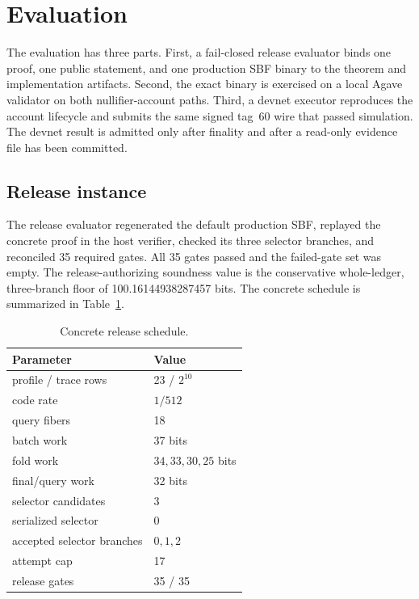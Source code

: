 \section{Evaluation}
\label{sec:evaluation}

The evaluation has three parts.  First, a fail-closed release evaluator binds
one proof, one public statement, and one production SBF binary to the theorem
and implementation artifacts.  Second, the exact binary is exercised on a
local Agave validator on both nullifier-account paths.  Third, a devnet
executor reproduces the account lifecycle and submits the same signed tag~60
wire that passed simulation.  The devnet result is admitted only after
finality and after a read-only evidence file has been committed.

\subsection{Release instance}
\label{sec:evaluation-release}

The release evaluator regenerated the default production SBF, replayed the
concrete proof in the host verifier, checked its three selector branches, and
reconciled 35 required gates.  All 35 gates passed and the failed-gate set was
empty.  The release-authorizing soundness value is the conservative
whole-ledger, three-branch floor of 100.16144938287457 bits.  The concrete
schedule is summarized in Table~\ref{tab:release-schedule}.

\begin{table}[t]
  \centering
  \small
  \caption{Concrete \Profile{} release schedule.}
  \label{tab:release-schedule}
  \begin{tabular}{l l}
    \toprule
    Parameter & Value \\
    \midrule
    profile / trace rows & 23 / \(2^{10}\) \\
    code rate & \(1/512\) \\
    query fibers & 18 \\
    batch work & 37 bits \\
    fold work & \(34,33,30,25\) bits \\
    final/query work & 32 bits \\
    selector candidates & 3 \\
    serialized selector & 0 \\
    accepted selector branches & \(0,1,2\) \\
    attempt cap & 17 \\
    release gates & 35 / 35 \\
    \bottomrule
  \end{tabular}
\end{table}

